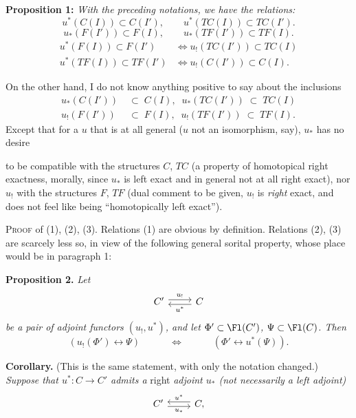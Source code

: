 \textbf{Proposition 1:} \textit{With the preceding notations, we have the relations:}
\[
u^*(C(I)) \subset C(I'), \qquad u^*(TC(I)) \subset TC(I'). \tag*{(1)}
\]
\[
u_*(F(I')) \subset F(I), \qquad u_*(TF(I')) \subset TF(I). \tag*{(2)}
\]
\[
\begin{aligned}
u^*(F(I)) \subset F(I') &\iff u_{!}(TC(I')) \subset TC(I)\\
u^*(TF(I)) \subset TF(I') &\iff u_{!}(C(I')) \subset C(I).
\end{aligned} \tag*{(3)}
\]

On the other hand, I do not know anything positive to say about the inclusions
\[
\begin{aligned}
u_*(C(I')) \;&\subset\; C(I), \;\; u_*(TC(I')) \;\subset\; TC(I)\\
u_{!}(F(I')) \;&\subset\; F(I), \;\; u_{!}(TF(I')) \;\subset\; TF(I).
\end{aligned}
\]
Except that for a $u$ that is at all general ($u$ not an isomorphism, say), $u_*$ has no desire

\noindent{}

\noindent to be compatible with the structures $C$, $TC$ (a property of homotopical right exactness, morally, since $u_*$ is left exact and in general not at all right exact), nor $u_{!}$ with the structures $F$, $TF$ (dual comment to be given, $u_{!}$ is \textit{right} exact, and does not feel like being ``homotopically left exact''). %

\textsc{Proof} of (1), (2), (3). Relations (1) are obvious by definition. Relations (2), (3) are scarcely less so, in view of the following general sorital property, whose place would be in paragraph 1:

\textbf{Proposition 2.} \textit{Let}
\[
\begin{tikzcd}
C' \arrow[r, shift left, "u_{!}"] & C \arrow[l, shift left, "u^*"]
\end{tikzcd}
\]
\textit{be a pair of adjoint functors $(u_{!},u^*)$, and let $\Phi' \subset \Fl(C')$, $\Psi \subset \Fl(C)$. Then}
\[
(u_{!}(\Phi') \longleftrightarrow \Psi) \qquad\quad \iff \qquad\quad (\Phi' \longleftrightarrow u^*(\Psi)).
\]

\textbf{Corollary.} (This is the same statement, with only the notation changed.) \textit{Suppose that $u^* : C \longrightarrow C'$ admits a} right \textit{adjoint $u_*$ (not necessarily a left adjoint)}
\[
\begin{tikzcd}
C' \arrow[r, shift right, "u_*"'] & C, \arrow[l, shift right, "u^*"']
\end{tikzcd}
\]


